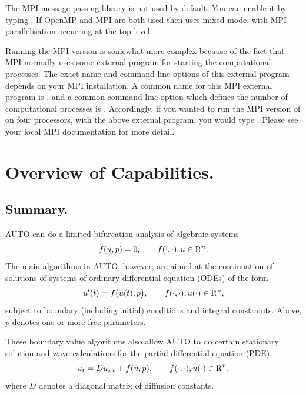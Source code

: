 \documentclass[12pt]{report}
\def\Rn{{\rm R}^n}
\begin{document}
The MPI message passing library is not used by default. You can enable it
by typing  . If OpenMP and MPI are
both used then \AUTO uses mixed mode, with MPI parallelisation
occurring at the top level.

Running the MPI version is somewhat more complex because of the fact
that MPI normally uses some external program for starting the
computational processes.  The exact name and command line options of
this external program depends on your MPI installation.  A common name
for this MPI external program is , and a common command
line option which defines the number of computational processes is .  Accordingly, if you wanted to run the MPI version of \AUTO
on four processors, with the above external program, you would
type .  Please see your local MPI
documentation for more detail.

\chapter{ Overview of Capabilities.} \label{ch:Overview}
\section{ Summary.} \label{sec:Summary}
{\cal AUTO} can do a limited bifurcation analysis of algebraic systems
\begin{equation} \label{1} 
  f( u , p ) = 0 ,  \qquad  f(\cdot,\cdot) , u \in \Rn.
\end{equation}
The main algorithms in {\cal AUTO}, however, are aimed at the continuation
of solutions of systems of ordinary differential equation (ODEs) of the form
\begin{equation} \label{2} 
 u'(t) = f\bigl( u(t) , p \bigr) , 
  \qquad  f(\cdot,\cdot) , u(\cdot) \in \Rn,
\end{equation}
subject to boundary (including initial) conditions and integral constraints.
Above, $p$ denotes one or more free parameters.

These boundary value algorithms also allow {\cal AUTO} to do certain stationary 
solution and wave calculations for the partial differential equation (PDE)
\begin{equation} \label{3} 
  u_t = D u_{xx} + f( u , p ), 
  \qquad  f(\cdot,\cdot) , u(\cdot) \in \Rn,
\end{equation}
where $D$ denotes a diagonal matrix of diffusion constants.
\end{document}
